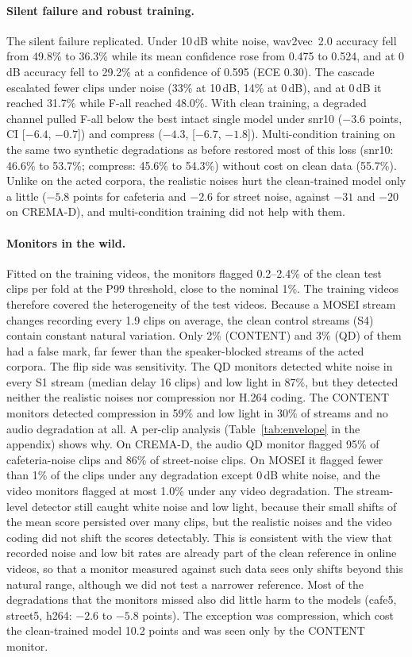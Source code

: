 \paragraph{Silent failure and robust training.} The silent failure replicated. Under 10\,dB white noise, wav2vec~2.0 accuracy fell from 49.8\% to 36.3\% while its mean confidence rose from 0.475 to 0.524, and at 0\,dB accuracy fell to 29.2\% at a confidence of 0.595 (ECE 0.30). The cascade escalated fewer clips under noise (33\% at 10\,dB, 14\% at 0\,dB), and at 0\,dB it reached 31.7\% while F-all reached 48.0\%. With clean training, a degraded channel pulled F-all below the best intact single model under snr10 ($-3.6$ points, CI [$-6.4$, $-0.7$]) and compress ($-4.3$, [$-6.7$, $-1.8$]). Multi-condition training on the same two synthetic degradations as before restored most of this loss (snr10: 46.6\% to 53.7\%; compress: 45.6\% to 54.3\%) without cost on clean data (55.7\%). Unlike on the acted corpora, the realistic noises hurt the clean-trained model only a little ($-5.8$ points for cafeteria and $-2.6$ for street noise, against $-31$ and $-20$ on CREMA-D), and multi-condition training did not help with them.

\paragraph{Monitors in the wild.} Fitted on the training videos, the monitors flagged 0.2--2.4\% of the clean test clips per fold at the P99 threshold, close to the nominal 1\%. The training videos therefore covered the heterogeneity of the test videos. Because a MOSEI stream changes recording every 1.9 clips on average, the clean control streams (S4) contain constant natural variation. Only 2\% (CONTENT) and 3\% (QD) of them had a false mark, far fewer than the speaker-blocked streams of the acted corpora. The flip side was sensitivity. The QD monitors detected white noise in every S1 stream (median delay 16 clips) and low light in 87\%, but they detected neither the realistic noises nor compression nor H.264 coding. The CONTENT monitors detected compression in 59\% and low light in 30\% of streams and no audio degradation at all. A per-clip analysis (Table~\ref{tab:envelope} in the appendix) shows why. On CREMA-D, the audio QD monitor flagged 95\% of cafeteria-noise clips and 86\% of street-noise clips. On MOSEI it flagged fewer than 1\% of the clips under any degradation except 0\,dB white noise, and the video monitors flagged at most 1.0\% under any video degradation. The stream-level detector still caught white noise and low light, because their small shifts of the mean score persisted over many clips, but the realistic noises and the video coding did not shift the scores detectably. This is consistent with the view that recorded noise and low bit rates are already part of the clean reference in online videos, so that a monitor measured against such data sees only shifts beyond this natural range, although we did not test a narrower reference. Most of the degradations that the monitors missed also did little harm to the models (cafe5, street5, h264: $-2.6$ to $-5.8$ points). The exception was compression, which cost the clean-trained model 10.2 points and was seen only by the CONTENT monitor.

